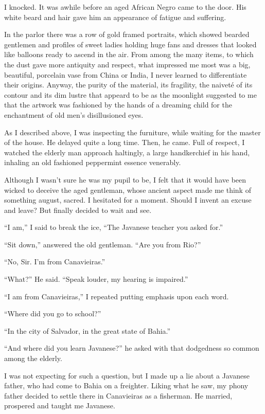 \documentclass[a4paper,12pt]{book}
\begin{document}
I knocked. It was awhile before 
an aged African Negro came to the door. His white
beard and hair gave him an appearance of
fatigue and suffering.

In the parlor there was a row of gold framed portraits,
which showed bearded gentlemen and profiles of
sweet ladies holding huge fans and dresses
that looked like balloons ready to ascend in the air.
From among the many items,
to which the dust gave more antiquity and respect,
what impressed me most was a big, beautiful,
porcelain vase from China or India, I never
learned to differentiate their origins.
Anyway, the purity of the material,
its fragility, the naiveté of its contour
and its dim lustre that appeard to be
as the moonlight suggested to me that
the artwork was fashioned by the hands
of a dreaming child for
the enchantment of old men's  disillusioned eyes.

As I described above, I was inspecting the furniture,
while waiting for the master of the house.
He delayed quite a long time. Then, he came.
Full of respect, I watched the elderly man
approach haltingly,
a large handkerchief in his
hand, inhaling an old fashioned peppermint
essence venerably.

Although I wasn't sure he was my pupil to be, I felt
that it would have been wicked to deceive the
aged gentleman, whose ancient aspect made
me think of something august, sacred.
I hesitated for a moment. Should I invent
an excuse and leave? But finally
decided to wait and see.

``I am,'' I said to break the ice,
``The Javanese teacher you asked for.''

``Sit down,'' answered the old gentleman.
``Are you from Rio?''

``No, Sir. I'm from Canavieiras.''

``What?'' He said. ``Speak louder, my hearing is impaired.''

``I am from Canavieiras,'' I repeated putting emphasis
upon each word.

``Where did you go to school?''

``In the city of Salvador, in the great state of Bahia.''

``And where did you learn Javanese?'' he
asked with that dodgedness so common among the elderly.

I was not expecting for such a question,
but I made up a lie about a
Javanese father, who had come to Bahia
on a freighter. Liking what he saw,
my phony father decided to
settle there in Canavieiras as a fisherman.
He married, prospered and taught me Javanese.
\end{document}
